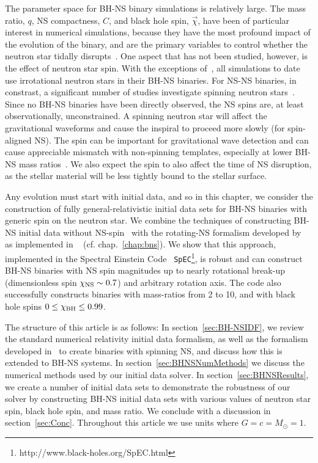 The parameter space for BH-NS binary simulations is relatively
large. The mass ratio, $q$, NS compactness, $C$, and black hole spin, $\vec{\chi}$, have
been of particular interest in numerical simulations, because they
have the most profound impact of the evolution of the binary, and are the primary 
variables to control whether the neutron star tidally disrupts~\citep{Foucart2012}.
One aspect that has not been studied, however, is the effect of
neutron star spin. With the exceptions of~\cite{Shibata:2006bs,East:2015yea}, all
simulations to date use irrotational neutron stars in their BH-NS
binaries. For NS-NS binaries, in constrast, a significant number of
studies investigate spinning neutron
stars~\citep{Baumgarte:2009fw,Tichy:2011gw,East:2012zn,Tichy:2012rp,Bernuzzi:2013rza,Kastaun:2013mv,Tsatsin:2013jca,Dietrich:2015pxa,East:2015yea,Tsokaros:2015fea,Tacik:2015tja}. Since
no BH-NS binaries have been directly observed, the NS spins are, at
least observationally, unconstrained. A spinning neutron star will
affect the gravitational waveforms and cause the inspiral to proceed
more slowly (for spin-aligned NS). The spin can be important for
gravitational wave detection and can cause appreciable mismatch with
non-spinning templates, especially at lower BH-NS mass ratios~\citep{Ajith:2011ec}. We also expect the spin to also affect the time of
NS disruption, as the stellar material will be less tightly bound to
the stellar surface.


Any evolution must start with initial data, and so in this chapter, we
consider the construction of fully general-relativistic initial data
sets for BH-NS binaries with generic spin on the neutron star. We
combine the techniques of constructing BH-NS initial data without
NS-spin~\citep{FoucartEtAl:2008,Henriksson:2014tba} with the
rotating-NS formalism developed by ~\cite{Tichy:2012rp} as
implemented in ~\cite{Tacik:2015tja} (cf. chap.~\ref{chap:bns}). We show that this
approach, implemented in the Spectral Einstein Code {\tt
  SpEC}\footnote{http://www.black-holes.org/SpEC.html}, is robust and can construct BH-NS binaries
with NS spin magnitudes up to nearly rotational break-up
(dimensionless spin $\chi_{\rm NS}\sim 0.7$) and arbitrary rotation axis.
The code also successfully constructs binaries with mass-ratios
from 2 to 10, and with black hole spins $0\le \chi_{\rm BH}\le 0.99$.

The structure of this article is as follows: In
section~\ref{sec:BH-NSIDF}, we review the standard numerical
relativity initial data formalism, as well as the formalism developed
in~\cite{Tichy:2011gw} to create binaries with spinning NS, and
discuss how this is extended to BH-NS systems. In
section~\ref{sec:BHNSNumMethods} we discuss the numerical methods used
by our initial data solver. In section~\ref{sec:BHNSResults}, we
create a number of initial data sets to demonstrate the robustness of
our solver by constructing BH-NS initial data sets with various values
of neutron star spin, black hole spin, and mass ratio. We conclude
with a discussion in section~\ref{sec:Conc}. Throughout this article
we use units where $G=c=M_{\odot}=1$.

